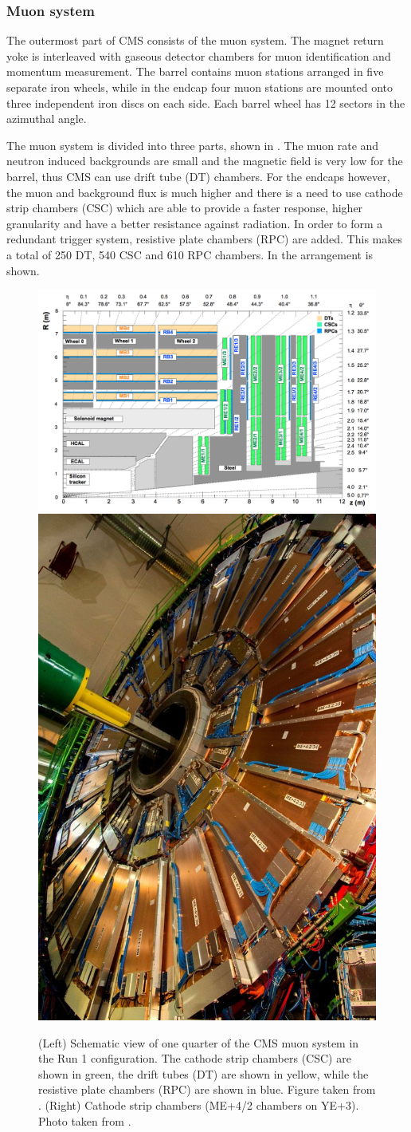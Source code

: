 \clearpage
\subsubsection{Muon system}
\label{sec:MUO}
The outermost part of CMS consists of the muon system. The magnet return yoke is interleaved with gaseous detector chambers for muon identification and momentum measurement. The barrel contains muon stations arranged in five separate iron wheels, while in the endcap four muon stations are mounted onto three independent iron discs on each side. Each barrel wheel has 12 sectors in the azimuthal angle. 

The muon system is divided into three parts, shown in . The muon rate and neutron induced backgrounds are small and the magnetic field is very low for the barrel, thus CMS can use drift tube (DT) chambers. For the endcaps however, the muon and background flux is much higher and there is a need to use cathode strip chambers (CSC) which are able to provide a faster response, higher granularity and have a better resistance against radiation. In order to form a redundant trigger system, resistive plate chambers (RPC) are added. This makes a total of 250 DT, 540 CSC and 610 RPC chambers. In  the arrangement is shown.
\begin{figure}[htbp]
	\centering
	\includegraphics[width=.69\linewidth]{2_ExperimentalSetup/Figures/muonsys}
	\includegraphics[width=0.3\linewidth]{2_ExperimentalSetup/Figures/NfP5131122image6}
	\caption{(Left) Schematic view of one quarter of the CMS muon system in the Run 1 configuration. The cathode strip chambers (CSC) are shown in green, the drift tubes (DT) are shown in yellow, while the resistive plate chambers (RPC) are shown in blue. Figure  taken from \cite{Chatrchyan:1223944}. (Right) Cathode strip chambers (ME+4/2 chambers on YE+3). Photo taken from \cite{muon}.}
	\label{fig:muonsys}
\end{figure}


